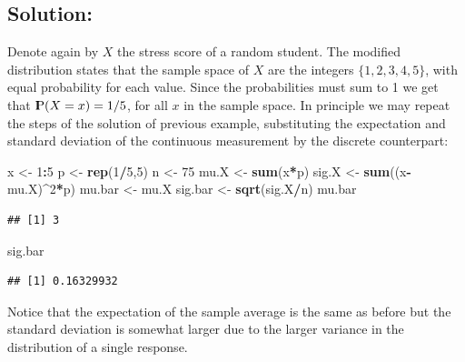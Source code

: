 \documentclass[]{krantz}
\makeatletter
\newenvironment{Shaded}{\begin{snugshade}}{\end{snugshade}}
\newcommand{\DecValTok}[1]{\textcolor[rgb]{0.00,0.00,0.81}{#1}}
\newcommand{\KeywordTok}[1]{\textcolor[rgb]{0.13,0.29,0.53}{\textbf{#1}}}
\newcommand{\NormalTok}[1]{#1}
\newcommand{\OperatorTok}[1]{\textcolor[rgb]{0.81,0.36,0.00}{\textbf{#1}}}
\newcommand{\StringTok}[1]{\textcolor[rgb]{0.31,0.60,0.02}{#1}}
\newcommand{\Prob}{{\rm I\kern-.3em P}}
\newenvironment{kframe}{%
\medskip{}
\setlength{\fboxsep}{.8em}
 \def\at@end@of@kframe{}%
 \ifinner\ifhmode%
  \def\at@end@of@kframe{\end{minipage}}%
  \begin{minipage}{\columnwidth}%
 \fi\fi%
 \def\FrameCommand##1{\hskip\@totalleftmargin \hskip-\fboxsep
 \colorbox{shadecolor}{##1}\hskip-\fboxsep
     \hskip-\linewidth \hskip-\@totalleftmargin \hskip\columnwidth}%
 \MakeFramed {\advance\hsize-\width
   \@totalleftmargin\z@ \linewidth\hsize
   \@setminipage}}%
 {\par\unskip\endMakeFramed%
 \at@end@of@kframe}
\renewenvironment{Shaded}{\begin{kframe}}{\end{kframe}}
\theoremstyle{definition}
\theoremstyle{definition}
\theoremstyle{definition}
\theoremstyle{remark}
\makeatother
\begin{document}
\hypertarget{solution-1}{%
\subsection*{Solution:}\label{solution-1}}


Denote again by \(X\) the stress score of a random student. The modified
distribution states that the sample space of \(X\) are the integers
\(\{1, 2, 3, 4, 5\}\), with equal probability for each value. Since the
probabilities must sum to 1 we get that \(\Prob(X = x) = 1/5\), for all
\(x\) in the sample space. In principle we may repeat the steps of the
solution of previous example, substituting the expectation and standard
deviation of the continuous measurement by the discrete counterpart:

\begin{Shaded}
\begin{Highlighting}[]
\NormalTok{x <-}\StringTok{ }\DecValTok{1}\OperatorTok{:}\DecValTok{5}
\NormalTok{p <-}\StringTok{ }\KeywordTok{rep}\NormalTok{(}\DecValTok{1}\OperatorTok{/}\DecValTok{5}\NormalTok{,}\DecValTok{5}\NormalTok{)}
\NormalTok{n <-}\StringTok{ }\DecValTok{75}
\NormalTok{mu.X <-}\StringTok{ }\KeywordTok{sum}\NormalTok{(x}\OperatorTok{*}\NormalTok{p)}
\NormalTok{sig.X <-}\StringTok{ }\KeywordTok{sum}\NormalTok{((x}\OperatorTok{-}\NormalTok{mu.X)}\OperatorTok{^}\DecValTok{2}\OperatorTok{*}\NormalTok{p)}
\NormalTok{mu.bar <-}\StringTok{ }\NormalTok{mu.X}
\NormalTok{sig.bar <-}\StringTok{ }\KeywordTok{sqrt}\NormalTok{(sig.X}\OperatorTok{/}\NormalTok{n)}
\NormalTok{mu.bar}
\end{Highlighting}
\end{Shaded}

\begin{verbatim}
## [1] 3
\end{verbatim}

\begin{Shaded}
\begin{Highlighting}[]
\NormalTok{sig.bar}
\end{Highlighting}
\end{Shaded}

\begin{verbatim}
## [1] 0.16329932
\end{verbatim}

Notice that the expectation of the sample average is the same as before
but the standard deviation is somewhat larger due to the larger variance
in the distribution of a single response.
\end{document}
